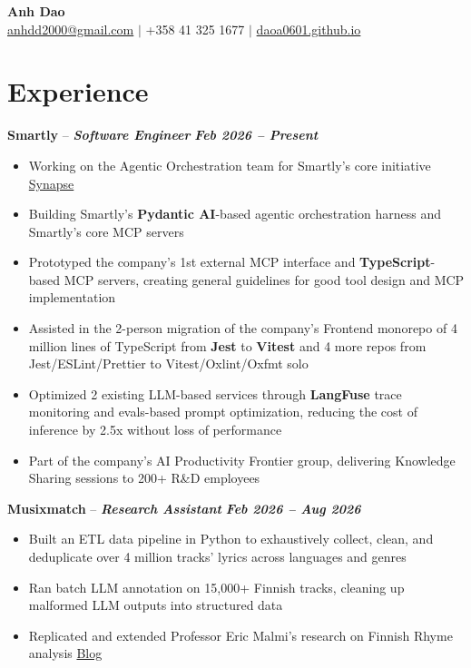 \documentclass[11pt,a4paper]{article}
\newcommand{\experienceheader}[3]{%
    \Needspace{7\baselineskip}%
    \noindent\textbf{#1} -- \textbf{\textit{#2}} \hfill \textbf{\textit{#3}}%
}
\begin{document}
\begin{center}
    {\LARGE\bfseries Anh Dao}\\[4pt]
    \href{mailto:anhdd2000@gmail.com}{anhdd2000@gmail.com} $\vert$
    +358 41 325 1677 $\vert$
    \href{https://daoa0601.github.io/}{daoa0601.github.io}
\end{center}

\section{Experience}

\experienceheader{Smartly}{Software Engineer}{Feb 2026 -- Present}
\begin{itemize}
    \item Working on the Agentic Orchestration team for Smartly's core initiative \href{https://www.smartly.io/product/synapse}{Synapse}
    \item Building Smartly's \textbf{Pydantic AI}-based agentic orchestration harness and Smartly's core MCP servers
    \item Prototyped the company's 1st external MCP interface and \textbf{TypeScript}-based MCP servers, creating general guidelines for good tool design and MCP implementation
    \item Assisted in the 2-person migration of the company's Frontend monorepo of 4 million lines of TypeScript from \textbf{Jest} to \textbf{Vitest} and 4 more repos from Jest/ESLint/Prettier to Vitest/Oxlint/Oxfmt solo
    \item Optimized 2 existing LLM-based services through \textbf{LangFuse} trace monitoring and evals-based prompt optimization, reducing the cost of inference by 2.5x without loss of performance
    \item Part of the company's AI Productivity Frontier group, delivering Knowledge Sharing sessions to 200+ R\&D employees
\end{itemize}

\vspace{3pt}

\experienceheader{Musixmatch}{Research Assistant}{Feb 2026 -- Aug 2026}
\begin{itemize}
    \item Built an ETL data pipeline in Python to exhaustively collect, clean, and deduplicate over 4 million tracks' lyrics across languages and genres
    \item Ran batch LLM annotation on 15,000+ Finnish tracks, cleaning up malformed LLM outputs into structured data
    \item Replicated and extended Professor Eric Malmi's research on Finnish Rhyme analysis \href{https://mining4meaning.com/2026/08/21/raplysaattori-ja-kadonneen-teroittimen-arvoitus/}{Blog}
\end{itemize}
\end{document}
